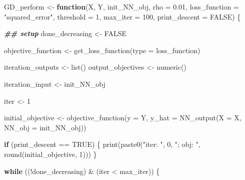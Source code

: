 \documentclass[
]{book}
\newenvironment{Shaded}{\begin{snugshade}}{\end{snugshade}}
\newcommand{\AttributeTok}[1]{\textcolor[rgb]{0.77,0.63,0.00}{#1}}
\newcommand{\ConstantTok}[1]{\textcolor[rgb]{0.00,0.00,0.00}{#1}}
\newcommand{\ControlFlowTok}[1]{\textcolor[rgb]{0.13,0.29,0.53}{\textbf{#1}}}
\newcommand{\DecValTok}[1]{\textcolor[rgb]{0.00,0.00,0.81}{#1}}
\newcommand{\DocumentationTok}[1]{\textcolor[rgb]{0.56,0.35,0.01}{\textbf{\textit{#1}}}}
\newcommand{\FloatTok}[1]{\textcolor[rgb]{0.00,0.00,0.81}{#1}}
\newcommand{\FunctionTok}[1]{\textcolor[rgb]{0.00,0.00,0.00}{#1}}
\newcommand{\NormalTok}[1]{#1}
\newcommand{\OtherTok}[1]{\textcolor[rgb]{0.56,0.35,0.01}{#1}}
\newcommand{\SpecialCharTok}[1]{\textcolor[rgb]{0.00,0.00,0.00}{#1}}
\newcommand{\StringTok}[1]{\textcolor[rgb]{0.31,0.60,0.02}{#1}}
\begin{document}
\begin{Shaded}
\begin{Highlighting}[]
\NormalTok{GD\_perform }\OtherTok{\textless{}{-}} \ControlFlowTok{function}\NormalTok{(X,}
\NormalTok{                       Y,}
\NormalTok{                       init\_NN\_obj,}
                       \AttributeTok{rho =} \FloatTok{0.01}\NormalTok{,}
                       \AttributeTok{loss\_function =} \StringTok{"squared\_error"}\NormalTok{,}
                       \AttributeTok{threshold =} \DecValTok{1}\NormalTok{,}
                       \AttributeTok{max\_iter =} \DecValTok{100}\NormalTok{,}
                       \AttributeTok{print\_descent =} \ConstantTok{FALSE}\NormalTok{) \{}
  
  \DocumentationTok{\#\# setup}
\NormalTok{  done\_decreasing }\OtherTok{\textless{}{-}} \ConstantTok{FALSE}
  
\NormalTok{  objective\_function }\OtherTok{\textless{}{-}} \FunctionTok{get\_loss\_function}\NormalTok{(}\AttributeTok{type =}\NormalTok{ loss\_function)}
  
\NormalTok{  iteration\_outputs }\OtherTok{\textless{}{-}} \FunctionTok{list}\NormalTok{()}
\NormalTok{  output\_objectives }\OtherTok{\textless{}{-}} \FunctionTok{numeric}\NormalTok{()}
  
\NormalTok{  iteration\_input }\OtherTok{\textless{}{-}}\NormalTok{ init\_NN\_obj}
  
\NormalTok{  iter }\OtherTok{\textless{}{-}} \DecValTok{1}
  
\NormalTok{  initial\_objective }\OtherTok{\textless{}{-}} \FunctionTok{objective\_function}\NormalTok{(}\AttributeTok{y =}\NormalTok{ Y,}
                                          \AttributeTok{y\_hat =} \FunctionTok{NN\_output}\NormalTok{(}\AttributeTok{X =}\NormalTok{ X,}
                                                            \AttributeTok{NN\_obj =}\NormalTok{ init\_NN\_obj))}
  
  \ControlFlowTok{if}\NormalTok{ (print\_descent }\SpecialCharTok{==} \ConstantTok{TRUE}\NormalTok{) \{}
    \FunctionTok{print}\NormalTok{(}\FunctionTok{paste0}\NormalTok{(}\StringTok{"iter: "}\NormalTok{, }\DecValTok{0}\NormalTok{, }\StringTok{"; obj: "}\NormalTok{, }\FunctionTok{round}\NormalTok{(initial\_objective, }\DecValTok{1}\NormalTok{)))}
\NormalTok{  \}}
  
  \ControlFlowTok{while}\NormalTok{ ((}\SpecialCharTok{!}\NormalTok{done\_decreasing) }\SpecialCharTok{\&}\NormalTok{ (iter }\SpecialCharTok{\textless{}}\NormalTok{ max\_iter)) \{}
    

\end{Highlighting}
\end{Shaded}
\end{document}

